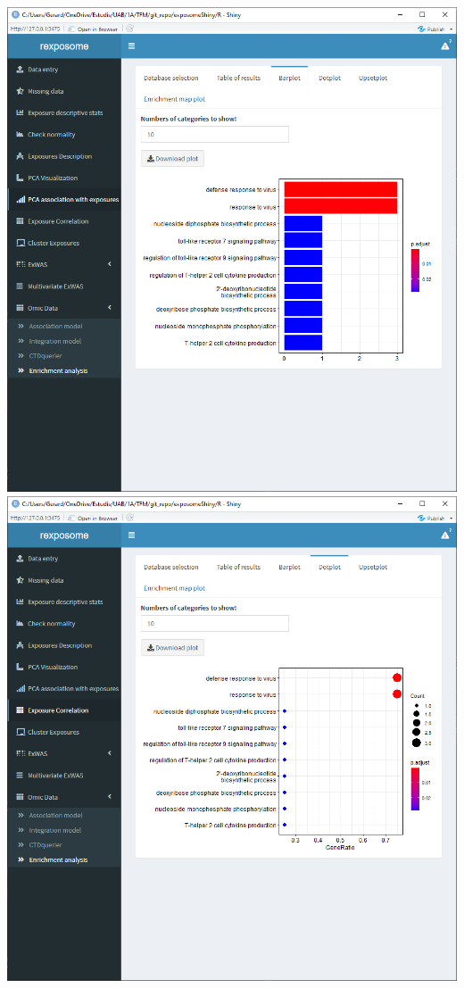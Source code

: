 \documentclass[
]{book}
\begin{document}
\includegraphics{images/analysis11_3.png}
\includegraphics{images/analysis11_4.png}
\end{document}
